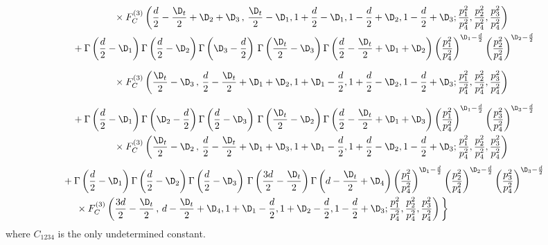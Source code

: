 \documentclass[a4paper,11pt,openright,twoside]{book}
\numberwithin{equation}{section}
\begin{document}
{{\begin{align}
		&\hspace{1.5cm}\times F_C^{(3)}\left(\frac{d}{2}-\frac{\D_t}{2}+\D_2+\D_3\,,\,\frac{\D_t}{2}-\D_1,1+\frac{d}{2}-\D_1,1-\frac{d}{2}+\D_2,1-\frac{d}{2}+\D_3;\frac{p_1^2}{p_4^2},\frac{p_2^2}{p_4^2},\frac{p_3^2}{p_4^2}\right)\notag\\
		&+\Gamma\left(\frac{d}{2}-\D_1\right)\Gamma\left(\frac{d}{2}-\D_2\right)\Gamma\left(\D_3-\frac{d}{2}\right)\,\Gamma\left(\frac{\D_t}{2}-\D_3\right)\Gamma\left(\frac{d}{2}-\frac{\D_t}{2}+\D_1+\D_2\right)\left(\frac{p_1^2}{p_4^2}\right)^{\D_1-\frac{d}{2}}\left(\frac{p_2^2}{p_4^2}\right)^{\D_2-\frac{d}{2}}\notag\\[1.5ex]
		&\hspace{1.5cm}\times F_C^{(3)}\left(\frac{\D_t}{2}-\D_3\,,\,\frac{d}{2}-\frac{\D_t}{2}+\D_1+\D_2,1+\D_1-\frac{d}{2},1+\frac{d}{2}-\D_2,1-\frac{d}{2}+\D_3;\frac{p_1^2}{p_4^2},\frac{p_2^2}{p_4^2},\frac{p_3^2}{p_4^2}\right)\notag\\[1.5ex]
		&+\Gamma\left(\frac{d}{2}-\D_1\right)\Gamma\left(\D_2-\frac{d}{2}\right)\Gamma\left(\frac{d}{2}-\D_3\right)\,\Gamma\left(\frac{\D_t}{2}-\D_2\right)\Gamma\left(\frac{d}{2}-\frac{\D_t}{2}+\D_1+\D_3\right)\left(\frac{p_1^2}{p_4^2}\right)^{\D_1-\frac{d}{2}}\left(\frac{p_3^2}{p_4^2}\right)^{\D_3-\frac{d}{2}}\notag\\
		&\hspace{1.5cm}\times F_C^{(3)}\left(\frac{\D_t}{2}-\D_2\,,\,\frac{d}{2}-\frac{\D_t}{2}+\D_1+\D_3,1+\D_1-\frac{d}{2},1+\frac{d}{2}-\D_2,1-\frac{d}{2}+\D_3;\frac{p_1^2}{p_4^2},\frac{p_2^2}{p_4^2},\frac{p_3^2}{p_4^2}\right)\notag
	\end{align}
	\begin{align}
		&+\Gamma\left(\frac{d}{2}-\D_1\right)\Gamma\left(\frac{d}{2}-\D_2\right)\Gamma\left(\frac{d}{2}-\D_3\right)\,\Gamma\left(\frac{3d}{2}-\frac{\D_t}{2}\right)\Gamma\left(d-\frac{\D_t}{2}+\D_4\right)\left(\frac{p_1^2}{p_4^2}\right)^{\D_1-\frac{d}{2}}\left(\frac{p_2^2}{p_4^2}\right)^{\D_2-\frac{d}{2}}\left(\frac{p_3^2}{p_4^2}\right)^{\D_3-\frac{d}{2}}\notag\\
		&\hspace{0.5cm}\times F_C^{(3)}\left(\frac{3d}{2}-\frac{\D_t}{2}\,,\,d-\frac{\D_t}{2}+\D_4,1+\D_1-\frac{d}{2},1+\D_2-\frac{d}{2},1-\frac{d}{2}+\D_3;\frac{p_1^2}{p_4^2},\frac{p_2^2}{p_4^2},\frac{p_3^2}{p_4^2}\right)\bigg\}
	\end{align}
	where $C_{1234}$ is the only undetermined constant. 
	
}}
\end{document}
